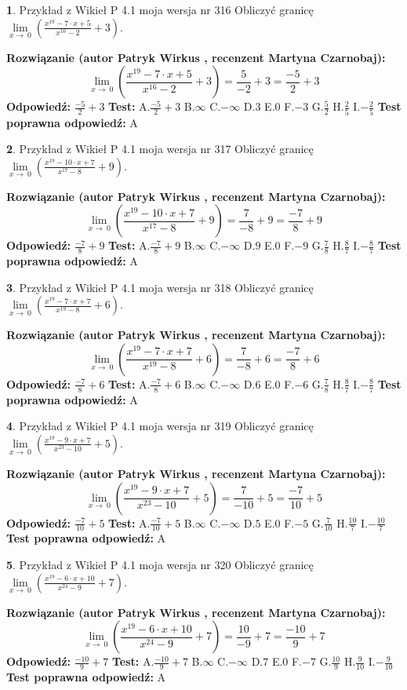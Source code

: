 \documentclass[12pt, a4paper]{article}
\theoremstyle{definition} %
\newtheorem{zad}{}
\newcommand{\zadStart}[1]{\begin{zad}#1\newline}
\newcommand{\zadStop}{\end{zad}}
\newcommand{\rozwStart}[2]{\noindent \textbf{Rozwiązanie (autor #1 , recenzent #2): }\newline}
\newcommand{\rozwStop}{\newline}
\newcommand{\odpStart}{\noindent \textbf{Odpowiedź:}\newline}
\newcommand{\odpStop}{\newline}
\newcommand{\testStart}{\noindent \textbf{Test:}\newline}
\newcommand{\testStop}{\newline}
\newcommand{\kluczStart}{\noindent \textbf{Test poprawna odpowiedź:}\newline}
\newcommand{\kluczStop}{\newline}
\begin{document}
\zadStart{Przykład z Wikieł P 4.1 moja wersja nr 316}
Obliczyć granicę $\lim\limits_{x\to\ 0}(\frac{x^{19}-7 \cdot x +5}{x^{16}-2}+3)$.
\zadStop
\rozwStart{Patryk Wirkus}{Martyna Czarnobaj}
$$\lim\limits_{x\to\ 0}(\frac{x^{19}-7 \cdot x +5}{x^{16}-2}+3)=\frac{5}{-2}+3=\frac{-5}{2}+3$$
\rozwStop
\odpStart
$\frac{-5}{2}+3$
\odpStop
\testStart
A.$\frac{-5}{2}+3$
B.$\infty$
C.$-\infty$
D.$3$
E.$0$
F.$-3$
G.$\frac{5}{2}$
H.$\frac{2}{5}$
I.$-\frac{2}{5}$
\testStop
\kluczStart
A
\kluczStop



\zadStart{Przykład z Wikieł P 4.1 moja wersja nr 317}
Obliczyć granicę $\lim\limits_{x\to\ 0}(\frac{x^{19}-10 \cdot x +7}{x^{17}-8}+9)$.
\zadStop
\rozwStart{Patryk Wirkus}{Martyna Czarnobaj}
$$\lim\limits_{x\to\ 0}(\frac{x^{19}-10 \cdot x +7}{x^{17}-8}+9)=\frac{7}{-8}+9=\frac{-7}{8}+9$$
\rozwStop
\odpStart
$\frac{-7}{8}+9$
\odpStop
\testStart
A.$\frac{-7}{8}+9$
B.$\infty$
C.$-\infty$
D.$9$
E.$0$
F.$-9$
G.$\frac{7}{8}$
H.$\frac{8}{7}$
I.$-\frac{8}{7}$
\testStop
\kluczStart
A
\kluczStop



\zadStart{Przykład z Wikieł P 4.1 moja wersja nr 318}
Obliczyć granicę $\lim\limits_{x\to\ 0}(\frac{x^{19}-7 \cdot x +7}{x^{19}-8}+6)$.
\zadStop
\rozwStart{Patryk Wirkus}{Martyna Czarnobaj}
$$\lim\limits_{x\to\ 0}(\frac{x^{19}-7 \cdot x +7}{x^{19}-8}+6)=\frac{7}{-8}+6=\frac{-7}{8}+6$$
\rozwStop
\odpStart
$\frac{-7}{8}+6$
\odpStop
\testStart
A.$\frac{-7}{8}+6$
B.$\infty$
C.$-\infty$
D.$6$
E.$0$
F.$-6$
G.$\frac{7}{8}$
H.$\frac{8}{7}$
I.$-\frac{8}{7}$
\testStop
\kluczStart
A
\kluczStop



\zadStart{Przykład z Wikieł P 4.1 moja wersja nr 319}
Obliczyć granicę $\lim\limits_{x\to\ 0}(\frac{x^{19}-9 \cdot x +7}{x^{23}-10}+5)$.
\zadStop
\rozwStart{Patryk Wirkus}{Martyna Czarnobaj}
$$\lim\limits_{x\to\ 0}(\frac{x^{19}-9 \cdot x +7}{x^{23}-10}+5)=\frac{7}{-10}+5=\frac{-7}{10}+5$$
\rozwStop
\odpStart
$\frac{-7}{10}+5$
\odpStop
\testStart
A.$\frac{-7}{10}+5$
B.$\infty$
C.$-\infty$
D.$5$
E.$0$
F.$-5$
G.$\frac{7}{10}$
H.$\frac{10}{7}$
I.$-\frac{10}{7}$
\testStop
\kluczStart
A
\kluczStop



\zadStart{Przykład z Wikieł P 4.1 moja wersja nr 320}
Obliczyć granicę $\lim\limits_{x\to\ 0}(\frac{x^{19}-6 \cdot x +10}{x^{24}-9}+7)$.
\zadStop
\rozwStart{Patryk Wirkus}{Martyna Czarnobaj}
$$\lim\limits_{x\to\ 0}(\frac{x^{19}-6 \cdot x +10}{x^{24}-9}+7)=\frac{10}{-9}+7=\frac{-10}{9}+7$$
\rozwStop
\odpStart
$\frac{-10}{9}+7$
\odpStop
\testStart
A.$\frac{-10}{9}+7$
B.$\infty$
C.$-\infty$
D.$7$
E.$0$
F.$-7$
G.$\frac{10}{9}$
H.$\frac{9}{10}$
I.$-\frac{9}{10}$
\testStop
\kluczStart
A
\kluczStop
\end{document}
